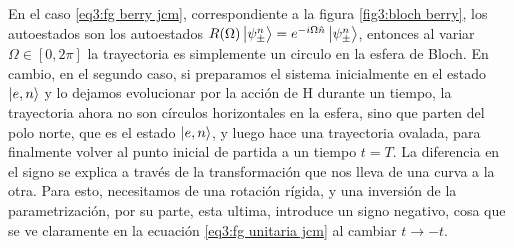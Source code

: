 En el caso \ref{eq3:fg berry jcm}, correspondiente a la figura \ref{fig3:bloch berry}, los autoestados son los autoestados $R(\Omega)\ket{\psi_\pm^n}=e^{-i\Omega \hat n}\ket{\psi_\pm^n}$, entonces al variar $\Omega\in [0,2\pi]$ la trayectoria es simplemente un circulo en la esfera de Bloch. En cambio, en el segundo caso, si preparamos el sistema inicialmente en el estado $\ket{e,n}$ y lo dejamos evolucionar por la acción de H durante un tiempo, la trayectoria ahora no son círculos horizontales en la esfera, sino que parten del polo norte, que es el estado $\ket{e,n}$, y luego hace una trayectoria ovalada, para finalmente volver al punto inicial de partida a un tiempo $t=T$. La diferencia en el signo se explica a través de la transformación que nos lleva de una curva a la otra. Para esto, necesitamos de una rotación rígida, y una inversión de la parametrización, por su parte, esta ultima, introduce un signo negativo, cosa que se ve claramente en la ecuación \ref{eq3:fg unitaria jcm} al cambiar $t\rightarrow -t$.

